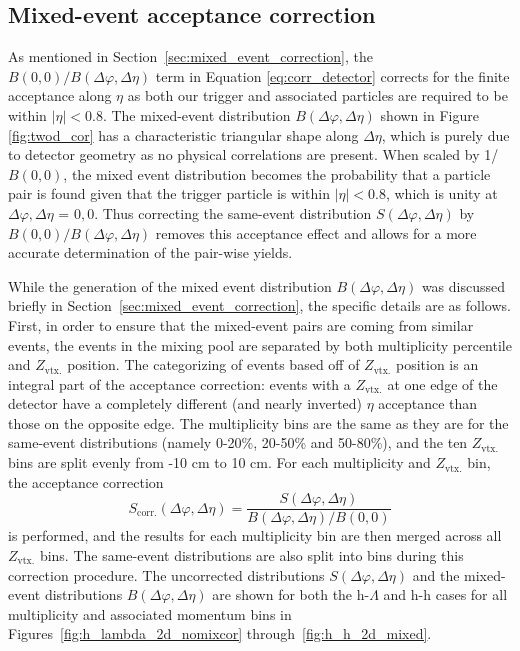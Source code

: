 \subsection{Mixed-event acceptance correction}
\label{sec:acceptance_corr}

As mentioned in Section~\ref{sec:mixed_event_correction}, the $B(0, 0)/B(\Delta\varphi, \Delta\eta)$ term in Equation \ref{eq:corr_detector} corrects for the finite acceptance along $\eta$ as both our trigger and associated particles are required to be within $|\eta| < 0.8$. The mixed-event distribution $B(\Delta\varphi, \Delta\eta)$ shown in Figure \ref{fig:twod_cor} has a characteristic triangular shape along $\Delta\eta$, which is purely due to detector geometry as no physical correlations are present. When scaled by 1/$B(0, 0)$, the mixed event distribution becomes the probability that a particle pair is found given that the trigger particle is within $|\eta| < 0.8$, which is unity at $\Delta\varphi, \Delta\eta$ = $0, 0$. Thus correcting the same-event distribution $S(\Delta\varphi, \Delta\eta)$ by $B(0, 0)/B(\Delta\varphi, \Delta\eta)$ removes this acceptance effect and allows for a more accurate determination of the pair-wise yields. 

While the generation of the mixed event distribution $B(\Delta\varphi, \Delta\eta)$ was discussed briefly in Section~\ref{sec:mixed_event_correction}, the specific details are as follows. First, in order to ensure that the mixed-event pairs are coming from similar events, the events in the mixing pool are separated by both multiplicity percentile and $Z_{\text{vtx.}}$ position. The categorizing of events based off of $Z_{\text{vtx.}}$ position is an integral part of the acceptance correction: events with a $Z_{\text{vtx.}}$ at one edge of the detector have a completely different (and nearly inverted) $\eta$ acceptance than those on the opposite edge. The multiplicity bins are the same as they are for the same-event distributions (namely 0-20\%, 20-50\% and 50-80\%), and the ten $Z_{\text{vtx.}}$ bins are split evenly from -10 cm to 10 cm.  For each multiplicity and $Z_{\text{vtx.}}$ bin, the acceptance correction
%
\begin{equation}
	S_{\text{corr.}}(\Delta\varphi, \Delta\eta) = \frac{S(\Delta\varphi, \Delta\eta)}{B(\Delta\varphi, \Delta\eta)/B(0, 0)}
\end{equation}
%
is performed, and the results for each multiplicity bin are then merged across all $Z_{\text{vtx.}}$ bins. The same-event distributions are also split into \zvtx bins during this correction procedure. The uncorrected distributions $S(\Delta\varphi, \Delta\eta)$ and the mixed-event distributions $B(\Delta\varphi, \Delta\eta)$ are shown for both the h-$\Lambda$ and h-h cases for all multiplicity and associated momentum bins in Figures~\ref{fig:h_lambda_2d_nomixcor} through~\ref{fig:h_h_2d_mixed}.


